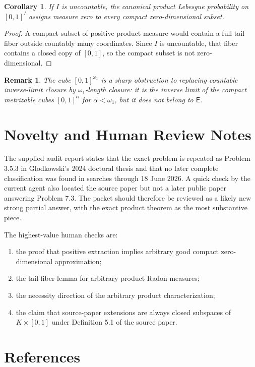 \documentclass[11pt]{article}
\newtheorem{corollary}{Corollary}
\newtheorem{remark}{Remark}
\newcommand{\E}{\mathsf E}
\begin{document}
\begin{corollary}
If \(I\) is uncountable, the canonical product Lebesgue probability on
\([0,1]^I\) assigns measure zero to every compact zero-dimensional subset.
\end{corollary}

\begin{proof}
A compact subset of positive product measure would contain a full tail fiber
outside countably many coordinates.  Since \(I\) is uncountable, that fiber
contains a closed copy of \([0,1]\), so the compact subset is not
zero-dimensional.
\end{proof}

\begin{remark}
The cube \([0,1]^{\omega_1}\) is a sharp obstruction to replacing countable
inverse-limit closure by \(\omega_1\)-length closure: it is the inverse limit of
the compact metrizable cubes \([0,1]^\alpha\) for \(\alpha<\omega_1\), but it
does not belong to \(\E\).
\end{remark}

\section*{Novelty and Human Review Notes}

The supplied audit report states that the exact problem is repeated as Problem
3.5.3 in Glodkowski's 2024 doctoral thesis and that no later complete
classification was found in searches through 18 June 2026.  A quick check by
the current agent also located the source paper but not a later public paper
answering Problem 7.3.  The packet should therefore be reviewed as a likely new
strong partial answer, with the exact product theorem as the most substantive
piece.

The highest-value human checks are:
\begin{enumerate}
\item the proof that positive extraction implies arbitrary good compact
zero-dimensional approximation;
\item the tail-fiber lemma for arbitrary product Radon measures;
\item the necessity direction of the arbitrary product characterization;
\item the claim that source-paper extensions are always closed subspaces of
\(K\times[0,1]\) under Definition 5.1 of the source paper.
\end{enumerate}

\section*{References}
\end{document}
